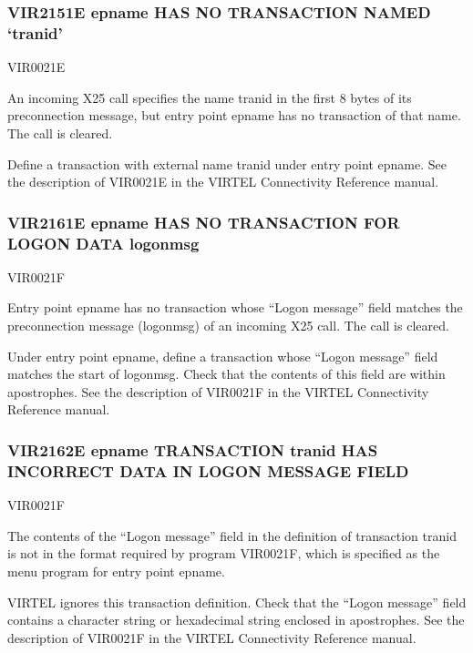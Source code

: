 \documentclass[letterpaper,10pt,english]{sphinxmanual}
\begin{document}
\subsubsection{VIR2151E epname HAS NO TRANSACTION NAMED ‘tranid’}
\label{\detokenize{messages:vir2151e-epname-has-no-transaction-named-tranid}}\begin{description}
\sphinxAtStartPar
VIR0021E

\sphinxAtStartPar
An incoming X25 call specifies the name tranid in the first 8 bytes of its preconnection message, but entry point epname has no transaction of that name. The call is cleared.

\sphinxAtStartPar
Define a transaction with external name tranid under entry point epname. See the description of VIR0021E in the VIRTEL Connectivity Reference manual.

\end{description}


\subsubsection{VIR2161E epname HAS NO TRANSACTION FOR LOGON DATA logonmsg}
\label{\detokenize{messages:vir2161e-epname-has-no-transaction-for-logon-data-logonmsg}}\begin{description}
\sphinxAtStartPar
VIR0021F

\sphinxAtStartPar
Entry point epname has no transaction whose “Logon message” field matches the preconnection message (logonmsg) of an incoming X25 call. The call is cleared.

\sphinxAtStartPar
Under entry point epname, define a transaction whose “Logon message” field matches the start of logonmsg. Check that the contents of this field are within apostrophes. See the description of VIR0021F in the VIRTEL Connectivity Reference manual.

\end{description}


\subsubsection{VIR2162E epname TRANSACTION tranid HAS INCORRECT DATA IN LOGON MESSAGE FIELD}
\label{\detokenize{messages:vir2162e-epname-transaction-tranid-has-incorrect-data-in-logon-message-field}}\begin{description}
\sphinxAtStartPar
VIR0021F

\sphinxAtStartPar
The contents of the “Logon message” field in the definition of transaction tranid is not in the format required by program VIR0021F, which is specified as the menu program for entry point epname.

\sphinxAtStartPar
VIRTEL ignores this transaction definition. Check that the “Logon message” field contains a character string or hexadecimal string enclosed in apostrophes. See the description of VIR0021F in the VIRTEL Connectivity Reference manual.

\end{description}
\end{document}
